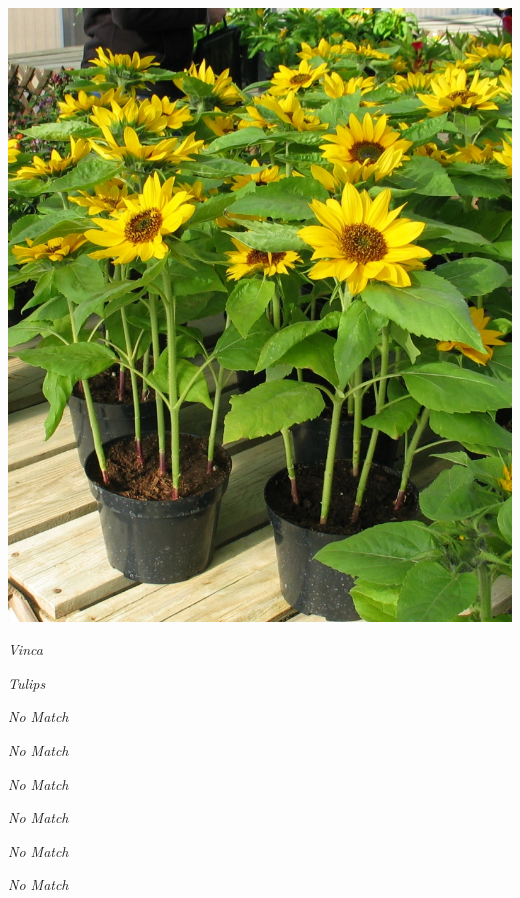 \documentclass{article}
\begin{document}
\begin{center}
\includegraphics[width=0.9\textheight, angle=90]{../Sunflower_pots.jpg}
\end{center}
\newpage

\noindent   
\vfill
\centerline{{\Large\emph{Vinca}}}
\vfill
\newpage

\noindent   
\vfill
\centerline{{\Large\emph{Tulips}}}
\vfill
\newpage

\noindent   
\vfill
\centerline{{\Large\emph{No Match}}}
\vfill
\newpage

\noindent   
\vfill
\centerline{{\Large\emph{No Match}}}
\vfill
\newpage

\noindent   
\vfill
\centerline{{\Large\emph{No Match}}}
\vfill
\newpage

\noindent   
\vfill
\centerline{{\Large\emph{No Match}}}
\vfill
\newpage

\noindent   
\vfill
\centerline{{\Large\emph{No Match}}}
\vfill
\newpage

\noindent   
\vfill
\centerline{{\Large\emph{No Match}}}
\vfill
\newpage
\end{document}
